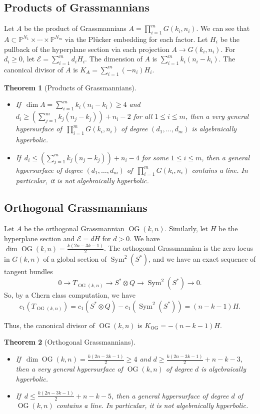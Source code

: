 \documentclass[11pt]{amsart}
\numberwithin{equation}{section}
\newtheorem{theorem}{Theorem}[section]
\theoremstyle{definition}
\theoremstyle{remark}
\renewcommand{\P}{\mathbb{P}}
\DeclareMathOperator{\Sym}{Sym}
\DeclareMathOperator{\OG}{OG}
\begin{document}
\subsection{Products of Grassmannians}

Let $A$ be the product of Grassmannians $A = \prod_{i=1}^m G(k_i,n_i)$. We can see that $A\subset \P^{N_1}\times \cdots \times \P^{N_m}$ via the Pl\"ucker embedding for each factor. Let $H_i$ be the pullback of the hyperplane section via each projection $A\to G(k_i,n_i)$. For $d_i\ge 0$, let $\mathcal{E} = \sum _{i=1}^m d_iH_i$. The dimension of $A$ is $\sum_{i=1}^m k_i(n_i-k_i)$. The canonical divisor of $A$ is $K_A = \sum _{i=1}^m (-n_i)H_i$.

\begin{theorem}[Products of Grassmannians]
\leavevmode
  \begin{itemize}
    \item If\, $\dim A = \sum_{i=1}^m k_i(n_i-k_i)\ge 4$ and $d_i\ge \left (\sum_{j=1}^m k_j(n_j-k_j)\right ) + n_i - 2$ for all $1\le i\le m$, then a very general hypersurface of\, $\prod_{i=1}^m G(k_i,n_i)$ of degree $(d_1,\hdots,d_m)$ is algebraically hyperbolic.
    \item If\, $d_i\le \left (\sum_{j=1}^m k_j(n_j-k_j)\right ) + n_i - 4$ for some $1\le i\le m$, then a general hypersurface of degree $(d_1,\hdots ,d_m)$ of\, $\prod_{i=1}^m G(k_i,n_i)$ contains a line. In particular, it is not algebraically hyperbolic.
\end{itemize}
\end{theorem}

\subsection{Orthogonal Grassmannians}

Let $A$ be the orthogonal Grassmannian $\OG(k,n)$. Similarly, let $H$ be the hyperplane section and $\mathcal{E}=dH$ for $d>0$. We have $\dim \OG(k,n) = \frac{k(2n-3k-1)}{2}$. The orthogonal Grassmannian is the zero locus in $G(k,n)$ of a global section of $\Sym ^2(S^*)$, and we have an exact sequence of tangent bundles
\[ 0\longrightarrow T_{\OG(k,n)}\longrightarrow S^*\otimes Q\longrightarrow \Sym^2(S^*)\longrightarrow 0. \]
So, by a Chern class computation, we have
\[ c_1(T_{\OG(k,n)}) = c_1(S^*\otimes Q) - c_1(\Sym^2 (S^*)) = (n-k-1)H. \]

Thus, the canonical divisor of $\OG(k,n)$ is $K_{\OG} = -(n-k-1)H$.

\begin{theorem}[Orthogonal Grassmannians]
  \leavevmode
    \begin{itemize}
        \item If\, $\dim \OG(k,n)=\frac{k(2n-3k-1)}{2}\ge 4$ and $d\ge \frac{k(2n-3k-1)}{2}+n-k-3$, then a very general hypersurface of $\OG(k,n)$ of degree $d$ is algebraically hyperbolic.
        \item If\, $d\le \frac{k(2n-3k-1)}{2}+n-k-5$, then a general hypersurface of degree $d$ of\, $\OG(k,n)$ contains a line. In particular, it is not algebraically hyperbolic.
    \end{itemize}
\end{theorem}
\end{document}
